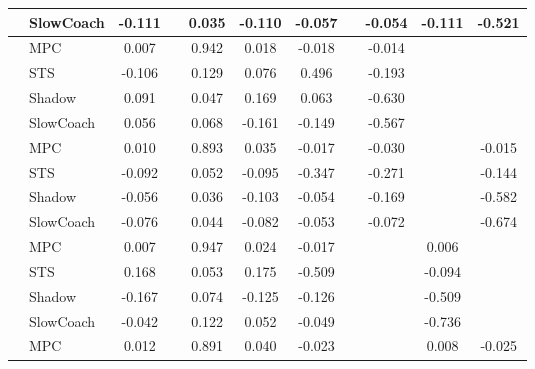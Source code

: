\begin{tabular}{|l|l|*{9}{c|}}
                                                           & SlowCoach &   -0.111 &        &     0.035 & -0.110 & -0.057 &     &  -0.054 &  -0.111 &   -0.521 \\
\midrule
[True, False, True, True, True, False, True, False, False] & MPC &    0.007 &        &     0.942 &  0.018 & -0.018 &     &  -0.014 &      &       \\
                                                           & STS &   -0.106 &        &     0.129 &  0.076 &  0.496 &     &  -0.193 &      &       \\
                                                           & Shadow &    0.091 &        &     0.047 &  0.169 &  0.063 &     &  -0.630 &      &       \\
                                                           & SlowCoach &    0.056 &        &     0.068 & -0.161 & -0.149 &     &  -0.567 &      &       \\
\midrule
[True, False, True, True, True, False, True, False, True] & MPC &    0.010 &        &     0.893 &  0.035 & -0.017 &     &  -0.030 &      &   -0.015 \\
                                                           & STS &   -0.092 &        &     0.052 & -0.095 & -0.347 &     &  -0.271 &      &   -0.144 \\
                                                           & Shadow &   -0.056 &        &     0.036 & -0.103 & -0.054 &     &  -0.169 &      &   -0.582 \\
                                                           & SlowCoach &   -0.076 &        &     0.044 & -0.082 & -0.053 &     &  -0.072 &      &   -0.674 \\
\midrule
[True, False, True, True, True, False, False, True, False] & MPC &    0.007 &        &     0.947 &  0.024 & -0.017 &     &      &   0.006 &       \\
                                                           & STS &    0.168 &        &     0.053 &  0.175 & -0.509 &     &      &  -0.094 &       \\
                                                           & Shadow &   -0.167 &        &     0.074 & -0.125 & -0.126 &     &      &  -0.509 &       \\
                                                           & SlowCoach &   -0.042 &        &     0.122 &  0.052 & -0.049 &     &      &  -0.736 &       \\
\midrule
[True, False, True, True, True, False, False, True, True] & MPC &    0.012 &        &     0.891 &  0.040 & -0.023 &     &      &   0.008 &   -0.025 \\

\end{tabular}
